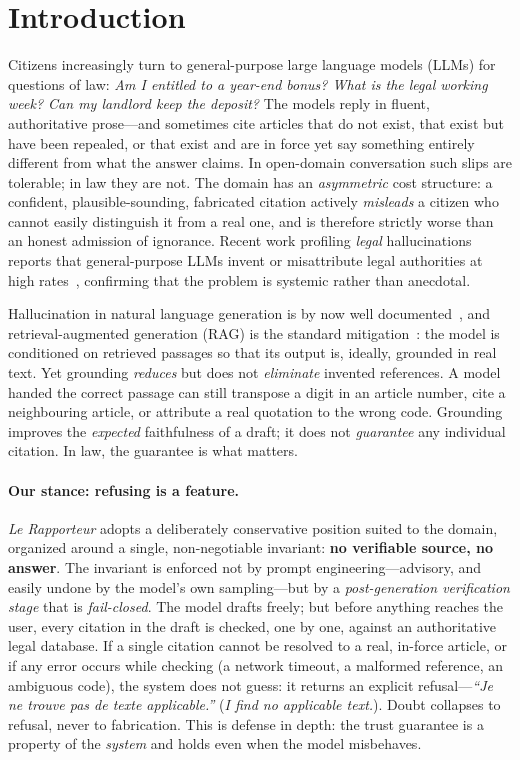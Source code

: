 \section{Introduction}
Citizens increasingly turn to general-purpose large language models (LLMs) for
questions of law: \emph{Am I entitled to a year-end bonus? What is the legal
working week? Can my landlord keep the deposit?} The models reply in fluent,
authoritative prose---and sometimes cite articles that do not exist, that exist
but have been repealed, or that exist and are in force yet say something
entirely different from what the answer claims. In open-domain conversation
such slips are tolerable; in law they are not. The domain has an
\emph{asymmetric} cost structure: a confident, plausible-sounding, fabricated
citation actively \emph{misleads} a citizen who cannot easily distinguish it
from a real one, and is therefore strictly worse than an honest admission of
ignorance. Recent work profiling \emph{legal} hallucinations reports that
general-purpose LLMs invent or misattribute legal authorities at high
rates~\cite{dahl2024legalfictions}, confirming that the problem is systemic
rather than anecdotal.

Hallucination in natural language generation is by now well
documented~\cite{ji2023hallucination, huang2025hallucination}, and
retrieval-augmented generation (RAG) is the standard
mitigation~\cite{lewis2020rag, gao2023ragsurvey}: the model is conditioned on
retrieved passages so that its output is, ideally, grounded in real text. Yet
grounding \emph{reduces} but does not \emph{eliminate} invented references. A
model handed the correct passage can still transpose a digit in an article
number, cite a neighbouring article, or attribute a real quotation to the wrong
code. Grounding improves the \emph{expected} faithfulness of a draft; it does
not \emph{guarantee} any individual citation. In law, the guarantee is what
matters.

\paragraph{Our stance: refusing is a feature.}
\emph{Le Rapporteur} adopts a deliberately conservative position suited to the
domain, organized around a single, non-negotiable invariant: \textbf{no
verifiable source, no answer}. The invariant is enforced not by prompt
engineering---advisory, and easily undone by the model's own sampling---but by
a \emph{post-generation verification stage} that is \emph{fail-closed}. The
model drafts freely; but before anything reaches the user, every citation in
the draft is checked, one by one, against an authoritative legal database. If a
single citation cannot be resolved to a real, in-force article, or if any error
occurs while checking (a network timeout, a malformed reference, an ambiguous
code), the system does not guess: it returns an explicit
refusal---\emph{``Je ne trouve pas de texte applicable.''} (\emph{I find no
applicable text.}). Doubt collapses to refusal, never to fabrication. This is
defense in depth: the trust guarantee is a property of the \emph{system} and
holds even when the model misbehaves.

